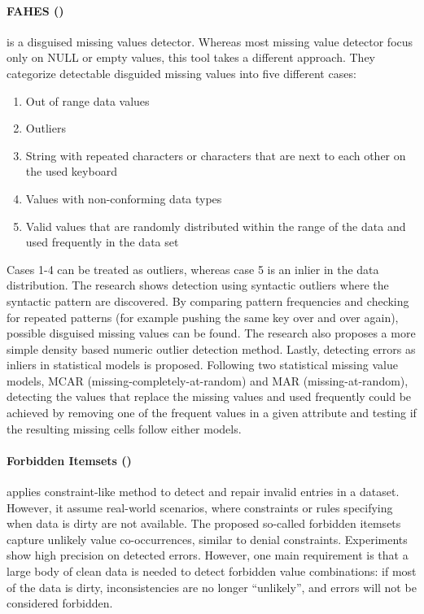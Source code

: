 \paragraph{FAHES (\cite{Qahtan2018-te})} is a disguised missing values detector. Whereas most missing value detector focus only on NULL or empty values, this tool takes a different approach. They categorize detectable disguided missing values into five different cases: 
\begin{enumerate}
    \item Out of range data values
    \item Outliers
    \item String with repeated characters or characters that are next to each other on the used keyboard
    \item Values with non-conforming data types
    \item Valid values that are randomly distributed within the range of the data and used frequently in the data set
\end{enumerate}

Cases 1-4 can be treated as outliers, whereas case 5 is an inlier in the data distribution. 
The research shows detection using syntactic outliers where the syntactic pattern are discovered. By comparing pattern frequencies and checking for repeated patterns (for example pushing the same key over and over again), possible disguised missing values can be found. The research also proposes a more simple density based numeric outlier detection method. Lastly, detecting errors as inliers in statistical models is proposed. Following two statistical missing value models, MCAR (missing-completely-at-random) and MAR (missing-at-random), detecting the values that replace the missing values and used frequently could be achieved by removing one of the frequent values in a given attribute and testing if the resulting missing cells follow either models.

\paragraph{Forbidden Itemsets (\cite{Rammelaere2019-ea})} applies constraint-like method to detect and repair invalid entries in a dataset. However, it assume real-world scenarios, where constraints or rules specifying when data is dirty are not available. The proposed so-called forbidden itemsets capture unlikely value co-occurrences, similar to denial constraints. Experiments show high precision on detected errors. However, one main requirement is that a large body of clean data is needed to detect forbidden value combinations: if most of the data is dirty, inconsistencies are no longer “unlikely”, and errors will not be considered forbidden. 

